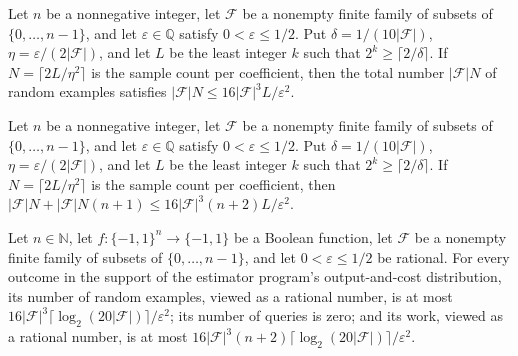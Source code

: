 \begin{theorem}
\label{FABL.finiteFamilyTotalRandomExamples_cast_le}
\leanok
{}
Let $n$ be a nonnegative integer, let $\mathcal F$ be a nonempty finite family of
subsets of $\{0,\ldots,n-1\}$, and let $\varepsilon\in\mathbb Q$ satisfy
$0<\varepsilon\leq 1/2$. Put $\delta=1/(10|\mathcal F|)$, $\eta=\varepsilon/(2|\mathcal
F|)$, and let $L$ be the least integer $k$ such that $2^k\geq\lceil 2/\delta\rceil$. If
$N=\lceil 2L/\eta^2\rceil$ is the sample count per coefficient, then the total number
$|\mathcal F|N$ of random examples satisfies $|\mathcal F|N\leq 16|\mathcal
F|^3L/\varepsilon^2$.
\end{theorem}

\begin{theorem}
\label{FABL.finiteFamilyTotalWork_cast_le}
\leanok
{}
Let $n$ be a nonnegative integer, let $\mathcal F$ be a nonempty finite family of
subsets of $\{0,\ldots,n-1\}$, and let $\varepsilon\in\mathbb Q$ satisfy
$0<\varepsilon\leq 1/2$. Put $\delta=1/(10|\mathcal F|)$, $\eta=\varepsilon/(2|\mathcal
F|)$, and let $L$ be the least integer $k$ such that $2^k\geq\lceil 2/\delta\rceil$. If
$N=\lceil 2L/\eta^2\rceil$ is the sample count per coefficient, then $|\mathcal
F|N+|\mathcal F|N(n+1)\leq 16|\mathcal F|^3(n+2)L/\varepsilon^2$.
\end{theorem}

\begin{theorem}
\label{FABL.finiteFamilyFourierEstimatorProgram_cost_polyBound}
\leanok
{}
Let $n\in\mathbb{N}$, let $f:\{-1,1\}^n\to\{-1,1\}$ be a Boolean function, let
$\mathcal{F}$ be a nonempty finite family of subsets of $\{0,\ldots,n-1\}$, and let
$0<\varepsilon\le 1/2$ be rational. For every outcome in the support of the estimator
program's output-and-cost distribution, its number of random examples, viewed as a
rational number, is at most
$16|\mathcal{F}|^3\lceil\log_2(20|\mathcal{F}|)\rceil/\varepsilon^2$; its number of
queries is zero; and its work, viewed as a rational number, is at most
$16|\mathcal{F}|^3(n+2)\lceil\log_2(20|\mathcal{F}|)\rceil/\varepsilon^2$.
\end{theorem}

